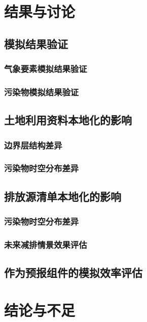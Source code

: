 \documentclass[14pt,hyperref={CJKbookmarks=true}]{beamer}
\begin{document}
\section{结果与讨论}
\subsection{模拟结果验证}
\subsubsection{气象要素模拟结果验证}
\subsubsection{污染物模拟结果验证}
\subsection{土地利用资料本地化的影响}
\subsubsection{边界层结构差异}
\subsubsection{污染物时空分布差异}
\subsection{排放源清单本地化的影响}
\subsubsection{污染物时空分布差异}
\subsubsection{未来减排情景效果评估}
\subsection{作为预报组件的模拟效率评估}
\section{结论与不足}
\end{document}
